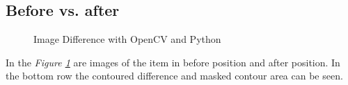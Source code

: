 \subsection{Before vs. after}
\begin{figure}[ht]
    \centering
    \hfill
    \hfill
    \hfill
    \caption{Image Difference with OpenCV and Python}
    \label{figure: imagework}
\end{figure}

In the \textit{Figure \ref{figure: imagework}} are images of the item in before position and after position. In the bottom row the contoured difference and masked contour area can be seen.  

